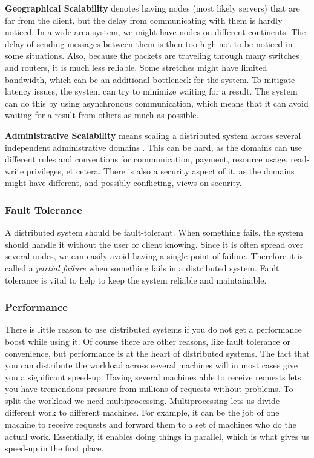\textbf{Geographical Scalability} denotes having nodes (most likely servers) that are far from the client, but the delay from communicating with them is hardly noticed. In a wide-area system, we might have nodes on different continents. The delay of sending messages between them is then too high not to be noticed in some situations. Also, because the packets are traveling through many switches and routers, it is much less reliable. Some stretches might have limited bandwidth, which can be an additional bottleneck for the system. To mitigate latency issues, the system can try to minimize waiting for a result. The system can do this by using asynchronous communication, which means that it can avoid waiting for a result from others as much as possible.

\textbf{Administrative Scalability} means scaling a distributed system across several independent administrative domains \cite{steen_distributed_2017}. This can be hard, as the domains can use different rules and conventions for communication, payment, resource usage, read-write privileges, et cetera. There is also a security aspect of it, as the domains might have different, and possibly conflicting, views on security.


\subsubsection{Fault Tolerance}
A distributed system should be fault-tolerant. When something fails, the system should handle it without the user or client knowing. Since it is often spread over several nodes, we can easily avoid having a single point of failure. Therefore it is called a \textit{partial failure}\cite{steen_distributed_2017} when something fails in a distributed system. Fault tolerance is vital to help to keep the system reliable and maintainable. 

\subsubsection{Performance}
There is little reason to use distributed systems if you do not get a performance boost while using it. Of course there are other reasons, like fault tolerance or convenience, but performance is at the heart of distributed systems. The fact that you can distribute the workload across several machines will in most cases give you a significant speed-up. Having several machines able to receive requests lets you have tremendous pressure from millions of requests without problems.
To split the workload we need multiprocessing. Multiprocessing lets us divide different work to different machines. For example, it can be the job of one machine to receive requests and forward them to a set of machines who do the actual work. Essentially, it enables doing things in parallel, which is what gives us speed-up in the first place.

